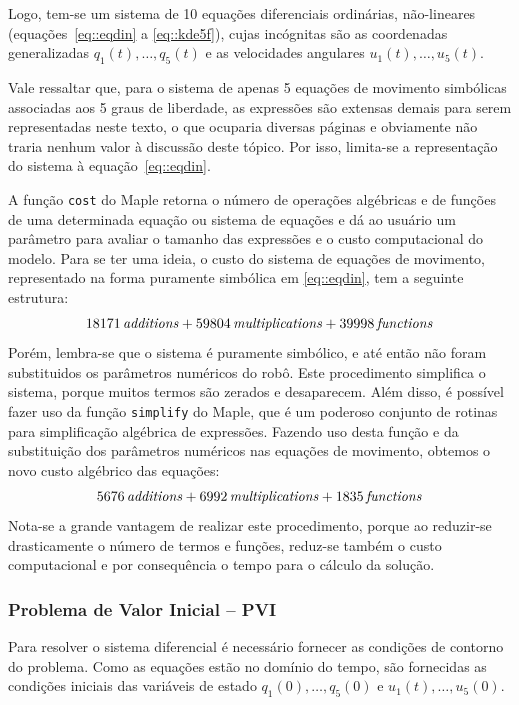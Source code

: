 \bigskip {} \bigskip

Logo, tem-se um sistema de 10 equações diferenciais ordinárias, não-lineares
(equações~\ref{eq::eqdin} a \ref{eq::kde5f}), cujas incógnitas são as
coordenadas generalizadas $q_{1}(t),\ldots, q_{5}(t)$ e as velocidades angulares
$u_{1}(t),\ldots, u_{5}(t)$.

Vale ressaltar que, para o sistema de apenas 5 equações de movimento simbólicas
associadas aos 5 graus de liberdade, as expressões são extensas demais para
serem representadas neste texto, o que ocuparia diversas páginas e obviamente
não traria nenhum valor à discussão deste tópico. Por isso, limita-se a
representação do sistema à equação~\ref{eq::eqdin}.

A função \texttt{cost} do Maple retorna o número de operações algébricas e de
funções de uma determinada equação ou sistema de equações e dá ao usuário um
parâmetro para avaliar o tamanho das expressões e o custo computacional do
modelo.
Para se ter uma ideia, o custo do sistema de equações de movimento, representado
na forma puramente simbólica em \ref{eq::eqdin}, tem  a seguinte estrutura:
%
	$$ 18171\,{\it additions}+59804\,{\it multiplications}+39998\,{\it 
functions} $$
%
Porém, lembra-se que o sistema é puramente simbólico, e até então não foram
substituidos os parâmetros numéricos do robô.
Este procedimento simplifica o sistema, porque muitos termos são zerados e
desaparecem.
Além disso, é possível fazer uso da função \texttt{simplify} do Maple, que é um
poderoso conjunto de rotinas para simplificação algébrica de expressões. Fazendo
uso desta função e da substituição dos parâmetros numéricos nas equações de
movimento, obtemos o novo custo algébrico das equações:
%
	$$ 5676\,{\it additions}+6992\,{\it multiplications}+1835\,{\it functions} $$
%
Nota-se a grande vantagem de realizar este procedimento, porque ao reduzir-se
drasticamente o número de termos e funções, reduz-se também o custo
computacional e por consequência o tempo para o cálculo da solução.

\subsubsection{Problema de Valor Inicial -- PVI}

Para resolver o sistema diferencial é necessário fornecer as condições de
contorno do problema. Como as equações estão no domínio do tempo, são fornecidas
as condições iniciais das variáveis de estado $q_{1}(0),\ldots, q_{5}(0)$ e
$u_{1}(t),\ldots, u_{5}(0)$.

